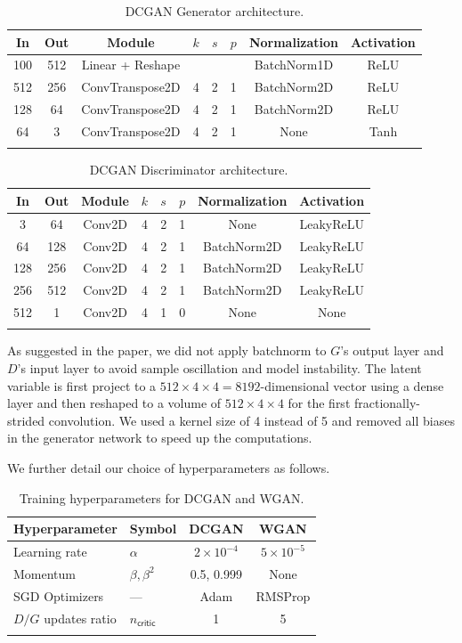 \documentclass[table]{article}
\begin{document}
\begin{table}[ht]
\centering
\begin{tabular}{c c ccc c c c}
\Xhline{2\arrayrulewidth}
In & Out & Module & $k$ & $s$ & $p$ & Normalization & Activation \\
\hline
100 & 512 &Linear + Reshape &&&& BatchNorm1D & ReLU \\
512 & 256 &ConvTranspose2D & 4 & 2 & 1 & BatchNorm2D & ReLU  \\
128 & 64 &ConvTranspose2D & 4 & 2 & 1 & BatchNorm2D & ReLU  \\
64 & 3 &ConvTranspose2D & 4 & 2 & 1 & None & Tanh\\
\Xhline{2\arrayrulewidth}
\end{tabular}
\caption{DCGAN Generator architecture.}
\end{table}

\begin{table}[ht]
\centering
\begin{tabular}{c c ccc c c c}
\Xhline{2\arrayrulewidth}
In & Out & Module & $k$ & $s$ & $p$ & Normalization & Activation  \\
\hline
3 & 64 &Conv2D & 4 & 2 & 1 & None & LeakyReLU \\
64 & 128 &Conv2D & 4 & 2 & 1 & BatchNorm2D & LeakyReLU \\
128 & 256 &Conv2D & 4 & 2 & 1 & BatchNorm2D & LeakyReLU \\
256 & 512 &Conv2D & 4 & 2 & 1 & BatchNorm2D & LeakyReLU \\
512 & 1 & Conv2D & 4 & 1 & 0& None & None \\
\Xhline{2\arrayrulewidth}
\end{tabular}
\caption{DCGAN Discriminator architecture.}
\end{table}

As suggested in the paper, we did not apply batchnorm to $G$'s output layer and $D$'s input layer to avoid sample oscillation and model instability. The latent variable is first project to a $512 \times 4 \times 4 = 8192$-dimensional vector using a dense layer and then reshaped to a volume of $512 \times 4 \times 4$ for the first fractionally-strided convolution. We used a kernel size of 4 instead of 5 and removed all biases in the generator network to speed up the computations.

We further detail our choice of hyperparameters as follows.


\begin{table}[ht]
\centering
\begin{tabular}{l C{1.5cm} c c}
\Xhline{2\arrayrulewidth}
Hyperparameter & Symbol & DCGAN & WGAN \\
\hline
Learning rate & $\alpha$ & $2 \times 10^{-4}$ & $5 \times 10^{-5}$ \\
Momentum & $\beta, \beta^2$ & 0.5, 0.999 & None \\
SGD Optimizers & --- & Adam  & RMSProp \\
$D/G$ updates ratio & $n_{\textsf{critic}}$ & 1 & 5 \\
\Xhline{2\arrayrulewidth}
\end{tabular}
\caption{Training hyperparameters for DCGAN and WGAN.}
\end{table}
\end{document}

